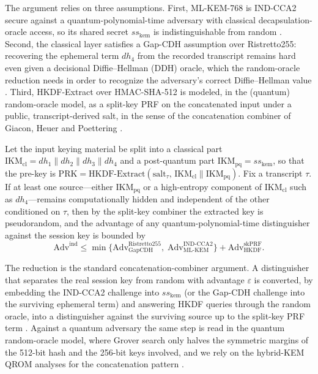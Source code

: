 \documentclass[conference]{IEEEtran}
\begin{document}
The argument relies on three assumptions. First, ML-KEM-768 is IND-CCA2 secure against a quantum-polynomial-time adversary with classical decapsulation-oracle access, so its shared secret $ss_{\mathrm{kem}}$ is indistinguishable from random \cite{fips203}. Second, the classical layer satisfies a Gap-CDH assumption over Ristretto255: recovering the ephemeral term $dh_4$ from the recorded transcript remains hard even given a decisional Diffie--Hellman (DDH) oracle, which the random-oracle reduction needs in order to recognize the adversary's correct Diffie--Hellman value \cite{devalence2024,mrena2024}. Third, HKDF-Extract over HMAC-SHA-512 is modeled, in the (quantum) random-oracle model, as a split-key PRF on the concatenated input under a public, transcript-derived salt, in the sense of the concatenation combiner of Giacon, Heuer and Poettering \cite{giacon2018}.

Let the input keying material be split into a classical part $\mathrm{IKM}_{\mathrm{cl}} = dh_1\|dh_2\|dh_3\|dh_4$ and a post-quantum part $\mathrm{IKM}_{\mathrm{pq}} = ss_{\mathrm{kem}}$, so that the pre-key is $\mathrm{PRK} = \mathrm{HKDF\text{-}Extract}(\mathrm{salt}_\tau,\, \mathrm{IKM}_{\mathrm{cl}}\|\mathrm{IKM}_{\mathrm{pq}})$. Fix a transcript $\tau$. If at least one source---either $\mathrm{IKM}_{\mathrm{pq}}$ or a high-entropy component of $\mathrm{IKM}_{\mathrm{cl}}$ such as $dh_4$---remains computationally hidden and independent of the other conditioned on $\tau$, then by the split-key combiner the extracted key is pseudorandom, and the advantage of any quantum-polynomial-time distinguisher against the session key is bounded by
\begin{equation}
\mathrm{Adv}^{\mathrm{ind}} \le
\min\!\bigl\{
\mathrm{Adv}_{\mathrm{GapCDH}}^{\mathrm{Ristretto255}},\;
\mathrm{Adv}_{\mathrm{ML\text{-}KEM}}^{\mathrm{IND\text{-}CCA2}}
\bigr\}
+ \mathrm{Adv}_{\mathrm{HKDF}}^{\mathrm{skPRF}}.
\label{eq:acit-comp-bound}
\end{equation}

The reduction is the standard concatenation-combiner argument. A distinguisher that separates the real session key from random with advantage $\varepsilon$ is converted, by embedding the IND-CCA2 challenge into $ss_{\mathrm{kem}}$ (or the Gap-CDH challenge into the surviving ephemeral term) and answering HKDF queries through the random oracle, into a distinguisher against the surviving source up to the split-key PRF term \cite{giacon2018,bindel2019}. Against a quantum adversary the same step is read in the quantum random-oracle model, where Grover search only halves the symmetric margins of the 512-bit hash and the 256-bit keys involved, and we rely on the hybrid-KEM QROM analyses for the concatenation pattern \cite{bindel2019}.
\end{document}
